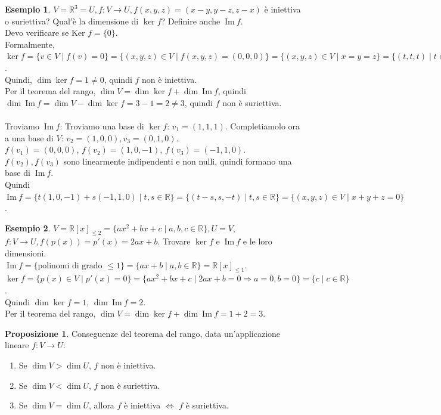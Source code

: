 \documentclass[a4paper]{article}
\newcommand{\IM}{\ \mathrm{Im} \ }
\theoremstyle{definition}
\newtheorem*{es}{Esempio}
\newtheorem*{prop}{Proposizione}
\begin{document}
\begin{es}
	$V = \mathbb{R}^3 = U, f: V \rightarrow U, f(x, y, z) = (x - y, y - z, z - x)$ è iniettiva o suriettiva? Qual'è la dimensione di $\ker f$? Definire anche $\IM f$. \\
	Devo verificare se Ker $f = \{0\}$. \\
	Formalmente, $\ker f = \{ v \in V \mid f(v) = 0 \} = \{ (x, y, z) \in V \mid f(x, y, z) = (0, 0, 0) \} = \{ (x, y, z) \in V \mid x = y = z \} = \{ (t, t, t) \mid t \in \mathbb{R} \}$. \\
	Quindi, $\dim \ker f = 1 \ne 0$, quindi $f$ non è iniettiva. \\
	Per il teorema del rango, $\dim V = \dim \ker f + \dim \IM f$,
	quindi $\dim \IM f = \dim V - \dim \ker f = 3 - 1 = 2 \ne 3$, quindi $f$ non è suriettiva. \\
	\\
	Troviamo $\IM f$:
	Troviamo una base di $\ker f$: $v_1 = (1, 1, 1)$. Completiamolo ora a una base di $V$: $v_2 = (1, 0, 0), v_3 = (0, 1, 0)$. \\
	$f(v_1) = (0, 0, 0)$, $f(v_2) = (1, 0, -1)$, $f(v_3) = (-1, 1, 0)$. \\
	$f(v_2), f(v_3)$ sono linearmente indipendenti e non nulli, quindi formano una base di $\IM f$. \\
	Quindi $\IM f = \{t(1, 0, -1) + s(-1, 1, 0) \mid t, s \in \mathbb{R}\} = \{(t - s, s, -t) \mid t, s \in \mathbb{R}\} = \{(x, y, z) \in V \mid x + y + z = 0\}$. \\
\end{es}

\begin{es}
	$V = \mathbb{R}[x]_{\le 2}=\{ax^2 + bx + c \mid a, b, c \in \mathbb{R}\}, U = V$, $f: V \rightarrow U, f(p(x)) = p'(x) = 2ax + b$.
	Trovare $\ker f$ e $\IM f$ e le loro dimensioni. \\
	$\IM f = \{ \text{polinomi di grado } \le 1 \} = \{ax + b \mid a, b \in \mathbb{R}\} = \mathbb{R}[x]_{\le 1}$. \\
	$\ker f = \{p(x) \in V \mid p'(x) = 0\} = \{ax^2 + bx + c \mid 2ax + b = 0 \Rightarrow a = 0, b = 0\} = \{c \mid c \in \mathbb{R}\}$. \\
	Quindi $\dim \ker f = 1$, $\dim \IM f = 2$. \\
	Per il teorema del rango, $\dim V = \dim \ker f + \dim \IM f = 1 + 2 = 3$.
\end{es}

\begin{prop}
	Conseguenze del teorema del rango, data un'applicazione lineare $f: V \rightarrow U$:
	\begin{enumerate}
		\item Se $\dim V > \dim U$, $f$ non è iniettiva.
		\item Se $\dim V < \dim U$, $f$ non è suriettiva.
		\item Se $\dim V = \dim U$, allora $f$ è iniettiva $\Leftrightarrow$ $f$ è suriettiva.
	\end{enumerate}
\end{prop}
\end{document}
